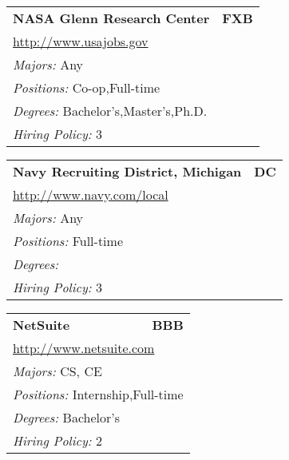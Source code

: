 \documentclass[twoside]{article}
\begin{document}
\begin{center}
\begin{multicols}{3}
\begin{FlushLeft}
\begin{minipage}{\columnwidth}
\end{minipage}
 
\begin{minipage}{\columnwidth}\begin{tabularx}{.95\columnwidth}{Xr}
                 {\Large\bf NASA Glenn Research Center} & {\Large\bf FXB}\\
    \multicolumn{2}{p{.95\columnwidth}}{\url{http://www.usajobs.gov}}\\
    \multicolumn{2}{p{.95\columnwidth}}{\emph{Majors:} Any}\\
    \multicolumn{2}{p{.95\columnwidth}}{\emph{Positions:} Co-op,Full-time}\\
    \multicolumn{2}{p{.95\columnwidth}}{\emph{Degrees:} Bachelor's,Master's,Ph.D.}\\
    \multicolumn{2}{p{.95\columnwidth}}{\emph{Hiring Policy:} 3}\\
    \end{tabularx}
    
\end{minipage}
 
\begin{minipage}{\columnwidth}\begin{tabularx}{.95\columnwidth}{Xr}
                 {\Large\bf Navy Recruiting District, Michigan} & {\Large\bf DC}\\
    \multicolumn{2}{p{.95\columnwidth}}{\url{http://www.navy.com/local}}\\
    \multicolumn{2}{p{.95\columnwidth}}{\emph{Majors:} Any}\\
    \multicolumn{2}{p{.95\columnwidth}}{\emph{Positions:} Full-time}\\
    \multicolumn{2}{p{.95\columnwidth}}{\emph{Degrees:} }\\
    \multicolumn{2}{p{.95\columnwidth}}{\emph{Hiring Policy:} 3}\\
    \end{tabularx}
    
\end{minipage}
 
\begin{minipage}{\columnwidth}\begin{tabularx}{.95\columnwidth}{Xr}
                 {\Large\bf NetSuite} & {\Large\bf BBB}\\
    \multicolumn{2}{p{.95\columnwidth}}{\url{http://www.netsuite.com}}\\
    \multicolumn{2}{p{.95\columnwidth}}{\emph{Majors:} CS, CE}\\
    \multicolumn{2}{p{.95\columnwidth}}{\emph{Positions:} Internship,Full-time}\\
    \multicolumn{2}{p{.95\columnwidth}}{\emph{Degrees:} Bachelor's}\\
    \multicolumn{2}{p{.95\columnwidth}}{\emph{Hiring Policy:} 2}\\
    \end{tabularx}
    

\end{minipage}
\end{FlushLeft}
\end{multicols}
\end{center}
\end{document}
